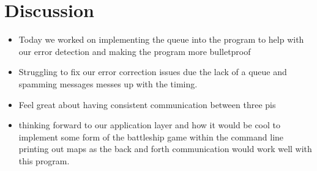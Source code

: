 \documentclass{article}
\begin{document}
\section*{Discussion}
\begin{itemize}
\item Today we worked on implementing the queue into the program to help with our error detection and making the program more bulletproof 
\item Struggling to fix our error correction issues due the lack of a queue and spamming messages messes up with the timing.
\item Feel great about having consistent communication between three pis
\item thinking forward to our application layer and how it would be cool to implement some form of the battleship game within the command line printing out maps as the back and forth communication would work well with this program.
\end{itemize}
\end{document}
